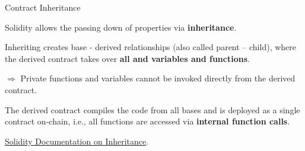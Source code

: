 \documentclass[]{beamer}
\begin{document}
\begin{frame}{Contract Inheritance}

\vspace{0.5em}

\begin{minipage}{0.35\textwidth}
	\begin{figure}[t]
		\centering
		\begin{tikzpicture}[scale=0.9, every node/.style={scale=0.9}]
			
		\end{tikzpicture}
	\end{figure}
\end{minipage}
\begin{minipage}{0.63\textwidth}
	Solidity allows the passing down of properties via \textbf{inheritance}.

	\vspace{0.5em}

	Inheriting creates base - derived relationships (also called parent – child), where the derived contract takes over \textbf{all  and  variables and functions}.
	
	\vspace{0.5em}

	$\Rightarrow$ Private functions and variables cannot be invoked directly from the derived contract.

\end{minipage}

\vspace{1em}

	The derived contract compiles the code from all bases and is deployed as a single contract on-chain, i.e.,  all functions are accessed via \textbf{internal function calls}. 

\vspace{1.5em}

\link \href{https://docs.soliditylang.org/en/latest/contracts.html\#inheritance}{Solidity Documentation on Inheritance}.

\end{frame}
\end{document}
